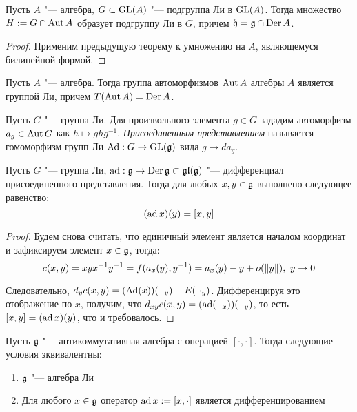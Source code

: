 \begin{corollary}
	Пусть $A$ "--- алгебра, $G \subset \operatorname{GL}(A)$ "--- подгруппа Ли в $\operatorname{GL}(A)$. Тогда множество $H := G \cap \operatorname{Aut}{A}$ образует подгруппу Ли в $G$, причем $\mathfrak h = \mathfrak g \cap \operatorname{Der}{A}$.
\end{corollary}

\begin{proof}
	Применим предыдущую теорему к умножению на $A$, являющемуся билинейной формой.
\end{proof}

\begin{corollary}
	Пусть $A$ "--- алгебра. Тогда группа автоморфизмов $\operatorname{Aut}{A}$ алгебры $A$ является группой Ли, причем $T(\operatorname{Aut}{A}) = \operatorname{Der}{A}$.
\end{corollary}

\begin{definition}
	Пусть $G$ "--- группа Ли. Для произвольного элемента $g \in G$ зададим автоморфизм $a_g \in \operatorname{Aut}{G}$ как $h \mapsto ghg^{-1}$. \textit{Присоединенным представлением} называется гомоморфизм групп Ли $\operatorname{Ad}: G \to \operatorname{GL}(\mathfrak g)$ вида $g \mapsto da_g$.
\end{definition}

\begin{theorem}
	Пусть $G$ "--- группа Ли, $\operatorname{ad}: \mathfrak g \to \operatorname{Der} \mathfrak g \subset \mathfrak{gl}(\mathfrak g)$ "--- дифференциал присоединенного представления. Тогда для любых $x, y \in \mathfrak{g}$ выполнено следующее равенство:
	\[(\operatorname{ad} x)(y) = [x, y]\]
\end{theorem}

\begin{proof}
	Будем снова считать, что единичный элемент является началом координат и зафиксируем элемент $x \in \mathfrak{g}$, тогда:
	\[c(x, y) = xyx^{-1}y^{-1} = f{(a_x(y), y^{-1})} = a_x(y) - y + o(\|y\|),~y \to 0\]
	
	Следовательно, $d_yc(x, y) = (\operatorname{Ad}(x))(\,\,\cdot_y) - E(\,\,\cdot_y)$. Дифференцируя это отображение по $x$, получим, что $d_{xy}c(x, y) = (\operatorname{ad}(\,\,\cdot_x))(\,\,\cdot_y)$, то есть $[x, y] = (\operatorname{ad} x)(y)$, что и требовалось.
\end{proof}

\begin{theorem}
	Пусть $\mathfrak g$ "--- антикоммутативная алгебра с операцией $[\cdot, \cdot]$. Тогда следующие условия эквивалентны:
	\begin{enumerate}
		\item $\mathfrak g$ "--- алгебра Ли
		\item Для любого $x \in \mathfrak g$ оператор $\operatorname{ad} x := [x, \cdot]$ является дифференцированием
	\end{enumerate}
\end{theorem}

